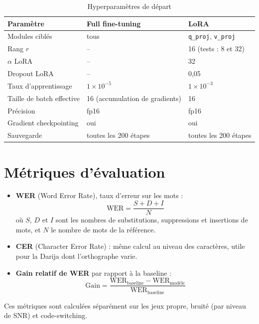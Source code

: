 \documentclass[12pt,a4paper]{report}
\begin{document}
\begin{table}[h]
  \centering
  \small
  \begin{tabular}{lll}
    \toprule
    \textbf{Paramètre} & \textbf{Full fine-tuning} & \textbf{LoRA} \\
    \midrule
    Modules ciblés          & tous           & \texttt{q\_proj}, \texttt{v\_proj} \\
    Rang $r$                & --             & 16 (tests : 8 et 32) \\
    $\alpha$ LoRA           & --             & 32 \\
    Dropout LoRA            & --             & 0,05 \\
    Taux d'apprentissage    & $1\times10^{-5}$ & $1\times10^{-3}$ \\
    Taille de batch effective & 16 (accumulation de gradients) & 16 \\
    Précision               & fp16           & fp16 \\
    Gradient checkpointing  & oui            & oui \\
    Sauvegarde              & toutes les 200 étapes & toutes les 200 étapes \\
    \bottomrule
  \end{tabular}
  \caption{Hyperparamètres de départ}
  \label{tab:hyper}
\end{table}

\section{Métriques d'évaluation}
\begin{itemize}
  \item \textbf{WER} (Word Error Rate), taux d'erreur sur les mots :
  \[
    \mathrm{WER} = \frac{S + D + I}{N}
  \]
  où $S$, $D$ et $I$ sont les nombres de substitutions, suppressions et insertions
  de mots, et $N$ le nombre de mots de la référence.
  \item \textbf{CER} (Character Error Rate) : même calcul au niveau des caractères,
        utile pour la Darija dont l'orthographe varie.
  \item \textbf{Gain relatif de WER} par rapport à la baseline :
  \[
    \mathrm{Gain} = \frac{\mathrm{WER}_{\text{baseline}} - \mathrm{WER}_{\text{modèle}}}{\mathrm{WER}_{\text{baseline}}}
  \]
\end{itemize}
Ces métriques sont calculées séparément sur les jeux propre, bruité (par niveau de
SNR) et code-switching.
\end{document}
